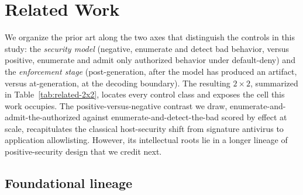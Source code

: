 \section{Related Work}
\label{sec:related}

We organize the prior art along the two axes that distinguish the controls in this study: the \emph{security model} (negative, enumerate and detect bad behavior, versus positive, enumerate and admit only authorized behavior under default-deny) and the \emph{enforcement stage} (post-generation, after the model has produced an artifact, versus at-generation, at the decoding boundary). The resulting \(2\times2\), summarized in Table~\ref{tab:related-2x2}, locates every control class and exposes the cell this work occupies. The positive-versus-negative contrast we draw, enumerate-and-admit-the-authorized against enumerate-and-detect-the-bad scored by effect at scale, recapitulates the classical host-security shift from signature antivirus to application allowlisting. However, its intellectual roots lie in a longer lineage of positive-security design that we credit next.

\subsection{Foundational lineage}
\label{sec:related-lineage}

